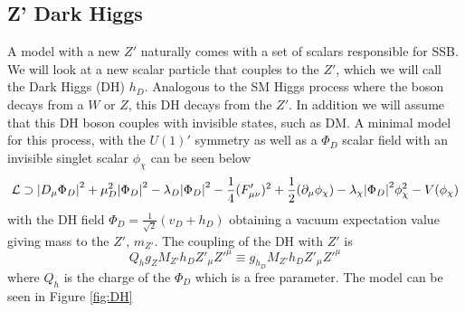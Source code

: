 \documentclass[12pt, a4paper]{book}
\begin{document}
\subsection{Z' Dark Higgs}
A model with a new $Z'$ naturally comes with a set of scalars responsible for SSB. We will look at a new scalar particle that couples to the $Z'$, which we will call the Dark Higgs (DH) $h_D$. Analogous to the SM Higgs process where the boson decays from a $W$ or $Z$, this DH decays from the $Z'$. 
In addition we will assume that this DH boson couples with invisible states, such as DM. A minimal model for this process, with the $U(1)'$ symmetry as well as a $\Phi_D$ scalar field with an invisible singlet scalar $\phi_\chi$ can be seen below
\begin{equation}
    \mathcal{L}\supset \abs{D_\mu\Phi_D}^2 + \mu_D^2\abs{\Phi_D}^2 -\lambda_D\abs{\Phi_D}^2-\frac{1}{4}(F'_{\mu\nu})^2 + \frac{1}{2}(\partial_\mu\phi_\chi)-\lambda_\chi\abs{\Phi_D}^2\phi_\chi^2 - V(\phi_\chi)
\end{equation}
with the DH field $\Phi_D =\frac{1}{\sqrt{2}}(v_D+h_D)$ obtaining a vacuum expectation value giving mass to the $Z'$, $m_{Z'}$. The coupling of the DH with $Z'$ is
\begin{equation}
    Q_hg_ZM_{Z'}h_DZ'_\mu Z'^\mu \equiv g_{h_D}M_{Z'}h_DZ'_\mu Z'^\mu
\end{equation}
where $Q_h$ is the charge of the $\Phi_D$ which is a free parameter.
The model can be seen in Figure \ref{fig:DH}
\end{document}
